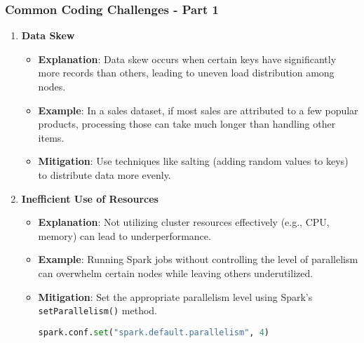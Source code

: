 \documentclass[aspectratio=169]{beamer}
\begin{document}
\begin{frame}[fragile]
    \frametitle{Common Coding Challenges - Part 1}
    \begin{enumerate}
        \item \textbf{Data Skew}
            \begin{itemize}
                \item \textbf{Explanation}: Data skew occurs when certain keys have significantly more records than others, leading to uneven load distribution among nodes.
                \item \textbf{Example}: In a sales dataset, if most sales are attributed to a few popular products, processing those can take much longer than handling other items.
                \item \textbf{Mitigation}: Use techniques like salting (adding random values to keys) to distribute data more evenly.
            \end{itemize}
        
        \item \textbf{Inefficient Use of Resources}
            \begin{itemize}
                \item \textbf{Explanation}: Not utilizing cluster resources effectively (e.g., CPU, memory) can lead to underperformance.
                \item \textbf{Example}: Running Spark jobs without controlling the level of parallelism can overwhelm certain nodes while leaving others underutilized.
                \item \textbf{Mitigation}: Set the appropriate parallelism level using Spark's \texttt{setParallelism()} method.
                \begin{lstlisting}[language=python]
spark.conf.set("spark.default.parallelism", 4)
                \end{lstlisting}
            \end{itemize}
    \end{enumerate}
\end{frame}
\end{document}
